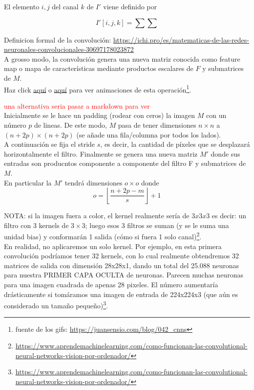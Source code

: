 \documentclass{article}
\begin{document}
El elemento $i,j$ del canal $k$ de $I'$ viene definido por

$$I'[i,j,k]=\sum \sum  $$

Definicion formal de la convolución: \url{https://ichi.pro/es/matematicas-de-las-redes-neuronales-convolucionales-30697178023872}\\

A grosso modo, la convolución genera una nueva matriz conocida como feature map o mapa de características mediante productos escalares de $F$ y submatrices de $M$.\\


Haz click \href{https://miro.medium.com/max/1052/1*GcI7G-JLAQiEoCON7xFbhg.gif}{aquí} o \href{https://cdn-media-1.freecodecamp.org/images/gb08-2i83P5wPzs3SL-vosNb6Iur5kb5ZH43}{aquí} para ver animaciones de esta operación\footnote{fuente de los gifs: \url{https://juansensio.com/blog/042_cnns}}.

\textcolor{red}{una alternativa seria pasar a markdown para ver }\\

Inicialmente se le hace un padding (rodear con ceros) la imagen $M$ con un número $p$ de lineas. De este modo, $M$ pasa de tener dimensiones $n\times n$ a $(n+2p)\times (n+2p) $ (se añade una fila/columna por todos los lados).\\

A continuación se fija el stride $s$, es decir, la cantidad de píxeles que se desplazará horizontalmente el filtro. Finalmente se genera una nueva matriz $M'$ donde sus entradas son producntos componente a componente del filtro F y submatrices de $M$.\\

En particular la $M'$ tendrá dimensiones $o\times o$ donde
$$o=\left\lfloor \frac{n+2p-m}{s}\right\rfloor+1$$

NOTA: si la imagen fuera a color, el kernel realmente sería de $3x3x3$ es decir: un filtro con 3 kernels de $3\times3$; luego  esos 3 filtros se suman (y se le suma una unidad bias) y conformarán 1 salida (cómo si fuera 1 solo canal)\footnote{\url{https://www.aprendemachinelearning.com/como-funcionan-las-convolutional-neural-networks-vision-por-ordenador/}}.\\

En realidad, no aplicaremos un solo kernel. Por ejemplo, en esta primera convolución podríamos tener 32 kernels, con lo cual realmente obtendremos 32 matrices de salida con dimensión 28x28x1, dando un total del 25.088 neuronas para nuestra PRIMER CAPA OCULTA de neuronas. Parecen muchas neuronas para una imagen cuadrada de apenas 28 pixeles. El número aumentaría drásticamente si tomáramos una imagen de entrada de 224x224x3 (que aún es considerado un tamaño pequeño)\footnote{\url{https://www.aprendemachinelearning.com/como-funcionan-las-convolutional-neural-networks-vision-por-ordenador/}}.\\
\end{document}
